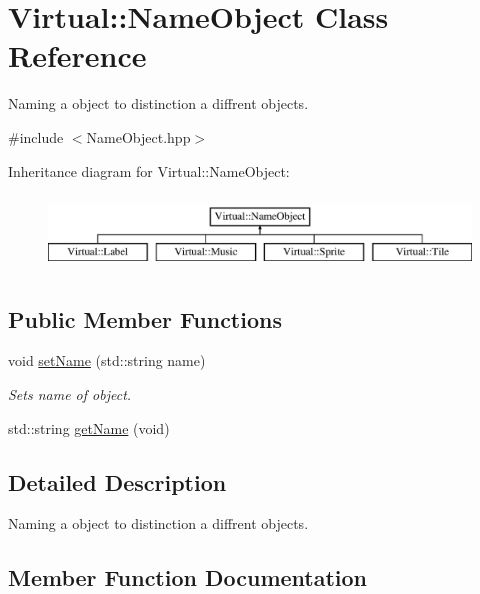 \hypertarget{class_virtual_1_1_name_object}{}\section{Virtual\+:\+:Name\+Object Class Reference}
\label{class_virtual_1_1_name_object}


Naming a object to distinction a diffrent objects.  




{\ttfamily \#include $<$Name\+Object.\+hpp$>$}

Inheritance diagram for Virtual\+:\+:Name\+Object\+:\begin{figure}[H]
\begin{center}
\leavevmode
\includegraphics[height=2.000000cm]{class_virtual_1_1_name_object}
\end{center}
\end{figure}
\subsection*{Public Member Functions}
\begin{DoxyCompactItemize}
\item 
void \hyperlink{class_virtual_1_1_name_object_a83cf1d1cf7b337169f060a64b6630eff}{set\+Name} (std\+::string name)
\begin{DoxyCompactList}\small\item\em Sets name of object. \end{DoxyCompactList}\item 
std\+::string \hyperlink{class_virtual_1_1_name_object_ac02bb53539491f47696ea22f09b4dc95}{get\+Name} (void)
\end{DoxyCompactItemize}


\subsection{Detailed Description}
Naming a object to distinction a diffrent objects. 

\subsection{Member Function Documentation}
\hypertarget{class_virtual_1_1_name_object_ac02bb53539491f47696ea22f09b4dc95}{}\label{class_virtual_1_1_name_object_ac02bb53539491f47696ea22f09b4dc95} 
